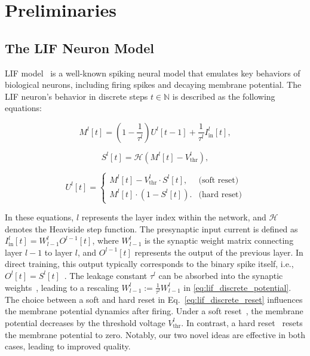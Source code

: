 \section{Preliminaries}
\label{sec:preliminary}

\subsection{The LIF Neuron Model}

LIF model~\cite{eshraghian:2021} is a well-known spiking neural model that emulates key behaviors of biological neurons, including firing spikes and decaying membrane potential. The LIF neuron’s behavior in discrete steps \(t \in \mathbb{N}\) is described as the following equations:

\begin{equation}
\label{eq:lif_discrete_potential}
    M^{l}[t] = \left( 1 - \frac{1}{\tau^{l}} \right) U^{l}[t-1] + \frac{1}{\tau^{l}} I^{l}_{\text{in}}[t],
\end{equation}

\begin{equation}
\label{eq:lif_discrete_firing}
    S^{l}[t] = \mathcal{H}\left( M^{l}[t] - V^{l}_{\text{thr}} \right),
\end{equation}

\begin{equation}
\label{eq:lif_discrete_reset}
    U^{l}[t] = \begin{cases}
        M^{l}[t] - V^{l}_{\text{thr}} \cdot S^{l}[t], & \text{(soft reset)} \\
        M^{l}[t] \cdot (1 - S^{l}[t]). & \text{(hard reset)}
\end{cases}
\end{equation}

In these equations, \( l \) represents the layer index within the network, and \(\mathcal{H}\) denotes the Heaviside step function. The presynaptic input current is defined as \( I^{l}_{\text{in}}[t] = W_{l-1}^{l} O^{l-1}[t] \), where \( W_{l-1}^{l} \) is the synaptic weight matrix connecting layer \( l-1 \) to layer \( l \), and \( O^{l-1}[t] \) represents the output of the previous layer. In direct training, this output typically corresponds to the binary spike itself, i.e., \( O^{l}[t] = S^{l}[t] \)~\cite{wu:2018}. The leakage constant \(\tau^{l}\) can be absorbed into the synaptic weights~\cite{eshraghian:2021}, leading to a rescaling \( W_{l-1}^{l}:=\frac{1}{\tau^{l}}W_{l-1}^{l} \) in \cref{eq:lif_discrete_potential}. The choice between a soft and hard reset in Eq.~\ref{eq:lif_discrete_reset} influences the membrane potential dynamics after firing. Under a soft reset~\cite{rueckauer:2016}, the membrane potential decreases by the threshold voltage \(V^{l}_{\text{thr}}\). In contrast, a hard reset~\cite{wu:2018} resets the membrane potential to zero. Notably, our two novel ideas are effective in both cases, leading to improved quality.

